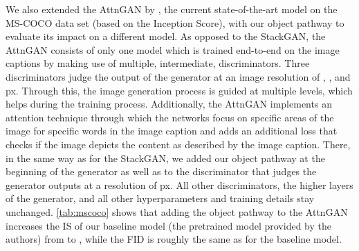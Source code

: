\documentclass{article} \usepackage{iclr2019_conference,times}
\begin{document}
	We also extended the AttnGAN by \cite{xu2017attngan}, the current state-of-the-art model on the MS-COCO data set (based on the Inception Score), with our object pathway to evaluate its impact on a different model.
	As opposed to the StackGAN, the AttnGAN consists of only one model which is trained end-to-end on the image captions by making use of multiple, intermediate, discriminators.
	Three discriminators judge the output of the generator at an image resolution of , , and  px.
	Through this, the image generation process is guided at multiple levels, which helps during the training process.
	Additionally, the AttnGAN implements an attention technique through which the networks focus on specific areas of the image for specific words in the image caption and adds an additional loss that checks if the image depicts the content as described by the image caption.
	There, in the same way as for the StackGAN, we added our object pathway at the beginning of the generator as well as to the discriminator that judges the generator outputs at a resolution of  px.
	All other discriminators, the higher layers of the generator, and all other hyperparameters and training details stay unchanged.
	\autoref{tab:mscoco} shows that adding the object pathway to the AttnGAN increases the IS of our baseline model (the pretrained model provided by the authors) from  to , while the FID is roughly the same as for the baseline model.
	
\end{document}
